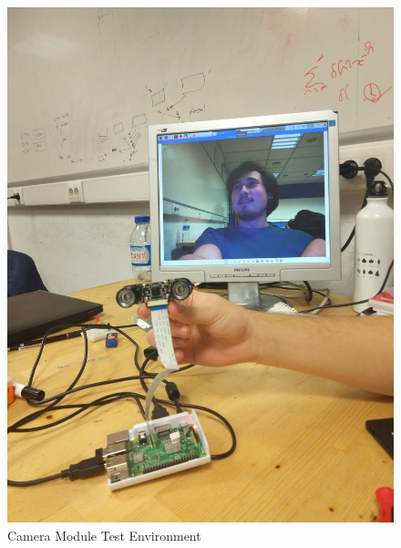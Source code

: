 \documentclass[a4paper,12pt]{article}
\begin{document}
\begin{appendices}
 	\begin{figure}[H]
		\centering
		\setlength{\unitlength}{\textwidth} 
		\includegraphics[width=\textwidth,height=\textheight,keepaspectratio]{cam1}
		\caption{\label{fig:cam1} Camera Module Test Environment}
	\end{figure}


\end{appendices}
\end{document}
